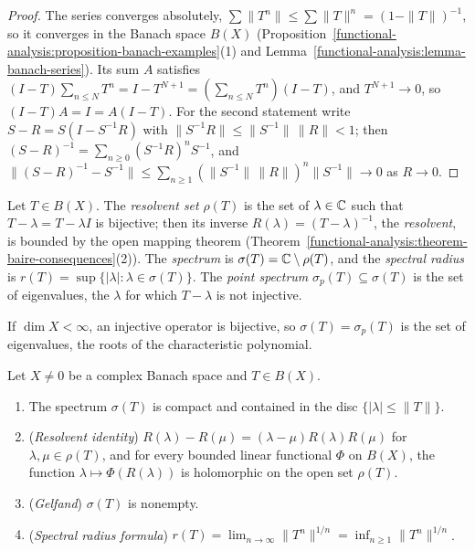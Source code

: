 \begin{proof}
The series converges absolutely, $\sum\|T^n\| \leq \sum\|T\|^n = (1 - \|T\|)^{-1}$, so it converges in the Banach space $B(X)$ (Proposition~\ref{functional-analysis:proposition-banach-examples}(1) and
Lemma~\ref{functional-analysis:lemma-banach-series}). Its sum $A$ satisfies $(I - T)\sum_{n \leq N}T^n = I - T^{N+1} = (\sum_{n \leq N}T^n)(I - T)$, and $T^{N+1} \to 0$, so $(I - T)A = I = A(I - T)$. For the
second statement write $S - R = S(I - S^{-1}R)$ with $\|S^{-1}R\| \leq \|S^{-1}\|\,\|R\| < 1$; then $(S - R)^{-1} = \sum_{n \geq 0}(S^{-1}R)^nS^{-1}$, and
$\|(S - R)^{-1} - S^{-1}\| \leq \sum_{n \geq 1}(\|S^{-1}\|\,\|R\|)^n\|S^{-1}\| \to 0$ as $R \to 0$.
\end{proof}

\begin{definition}\label{functional-analysis:definition-spectrum}
Let $T \in B(X)$. The \emph{resolvent set} $\rho(T)$ is the set of $\lambda \in \mathbb{C}$ such that $T - \lambda = T - \lambda I$ is bijective; then its inverse $R(\lambda) = (T - \lambda)^{-1}$, the \emph{resolvent}, is bounded
by the open mapping theorem (Theorem~\ref{functional-analysis:theorem-baire-consequences}(2)). The \emph{spectrum} is $\sigma(T) = \mathbb{C} \setminus \rho(T)$, and the \emph{spectral radius} is
$r(T) = \sup\{|\lambda| : \lambda \in \sigma(T)\}$. The \emph{point spectrum} $\sigma_p(T) \subseteq \sigma(T)$ is the set of eigenvalues, the $\lambda$ for which $T - \lambda$ is not injective.
\end{definition}

If $\dim X < \infty$, an injective operator is bijective, so $\sigma(T) = \sigma_p(T)$ is the set of eigenvalues, the roots of the characteristic polynomial.

\begin{theorem}\label{functional-analysis:theorem-spectrum}
Let $X \neq 0$ be a complex Banach space and $T \in B(X)$.
\begin{enumerate}
\item The spectrum $\sigma(T)$ is compact and contained in the disc $\{|\lambda| \leq \|T\|\}$.
\item (\emph{Resolvent identity}) $R(\lambda) - R(\mu) = (\lambda - \mu)R(\lambda)R(\mu)$ for $\lambda, \mu \in \rho(T)$, and for every bounded linear functional $\Phi$ on $B(X)$, the function $\lambda \mapsto \Phi(R(\lambda))$ is
holomorphic on the open set $\rho(T)$.
\item (\emph{Gelfand}) $\sigma(T)$ is nonempty.
\item (\emph{Spectral radius formula}) $r(T) = \lim_{n \to \infty}\|T^n\|^{1/n} = \inf_{n \geq 1}\|T^n\|^{1/n}$.
\end{enumerate}
\end{theorem}

